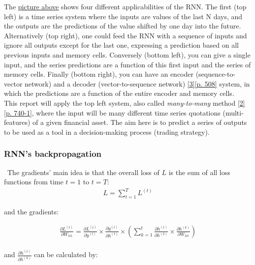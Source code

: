 The \hyperref[fig:RNN2]{picture above} shows four different applicabilities of the RNN. The first (top left) is a time series system where the inputs are values of the last N days, and the outputs are the predictions of the value shifted by one day into the future. Alternatively (top right), one could feed the RNN with a sequence of inputs and ignore all outputs except for the last one, expressing a prediction based on all previous inputs and memory cells. Conversely (bottom left), you can give a single input, and the series predictions are a function of this first input and the series of memory cells. Finally (bottom right), you can have an encoder (sequence-to-vector network) and a decoder (vector-to-sequence network) \hyperref[Bib:Aurelien Geron]{[3][p. 508]} system, in which the predictions are a function of the entire encoder and memory cells.\\

This report will apply the top left system, also called \textit{many-to-many} method \hyperref[Bib:Sebastian Raschka, Vahid Mirjalili]{[2][p. 740-1]}, where the input will be many different time series quotations (multi-features) of a given financial asset. The aim here is to predict a series of outputs to be used as a tool in a decision-making process (trading strategy).

\subsubsection{RNN's backpropagation}
\label{chap:RNN's backpropagation}

\quad \, The gradients' main idea is that the overall loss of $L$ is the sum of all loss functions from time $t=1$ to $t=T$:\\

\begin{align*}
L = \sum_{t=1}^{T}L^{(t)}
\end{align*}

\noindent and the gradients:

\begin{align*}
\frac{\partial L^{(t)}}{\partial W_{hh}}=\frac{\partial L^{(t)}}{\partial y^{(t)}} \times \frac{\partial y^{(t)}}{\partial h^{(t)}} \times ( \sum_{k=1}^{t} \frac{\partial h^{(t)}}{\partial h^{(k)}} \times \frac{\partial h^{(k)}}{\partial W_{hh}})
\end{align*}\\

\noindent and $\frac{\partial h^{(t)}}{\partial h^{(k)}}$ can be calculated by:

